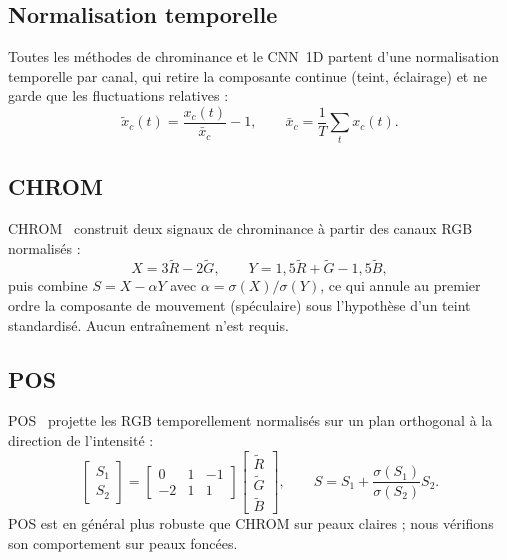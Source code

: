 \documentclass[11pt]{article}
\begin{document}
\subsection{Normalisation temporelle}
Toutes les méthodes de chrominance et le CNN~1D partent d'une normalisation
temporelle par canal, qui retire la composante continue (teint, éclairage) et ne
garde que les fluctuations relatives :
\begin{equation}
\tilde{x}_c(t) = \frac{x_c(t)}{\bar{x}_c} - 1, \qquad
\bar{x}_c = \frac{1}{T}\sum_t x_c(t).
\end{equation}

\subsection{CHROM}
CHROM~\cite{dehaan2013} construit deux signaux de chrominance à partir des canaux RGB
normalisés :
\begin{equation}
X = 3\tilde{R} - 2\tilde{G}, \qquad Y = 1{,}5\tilde{R} + \tilde{G} - 1{,}5\tilde{B},
\end{equation}
puis combine $S = X - \alpha Y$ avec $\alpha = \sigma(X)/\sigma(Y)$, ce qui annule au
premier ordre la composante de mouvement (spéculaire) sous l'hypothèse d'un teint
standardisé. Aucun entraînement n'est requis.

\subsection{POS}
POS~\cite{wang2017} projette les RGB temporellement normalisés sur un plan orthogonal
à la direction de l'intensité :
\begin{equation}
\begin{bmatrix} S_1 \\ S_2 \end{bmatrix} =
\begin{bmatrix} 0 & 1 & -1 \\ -2 & 1 & 1 \end{bmatrix}
\begin{bmatrix} \tilde{R} \\ \tilde{G} \\ \tilde{B} \end{bmatrix},
\qquad S = S_1 + \frac{\sigma(S_1)}{\sigma(S_2)} S_2.
\end{equation}
POS est en général plus robuste que CHROM sur peaux claires ; nous vérifions son
comportement sur peaux foncées.
\end{document}
